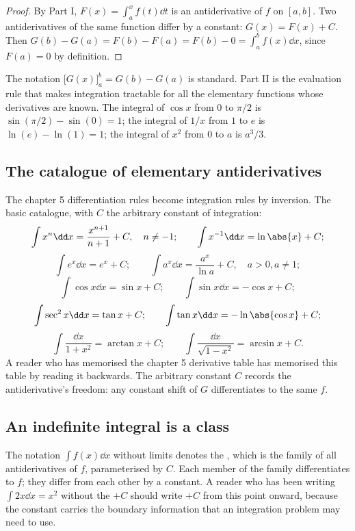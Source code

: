 \begin{proof}
By Part I, $F(x) = \int_{a}^{x} f(t) \dd t$ is an antiderivative of
$f$ on $[a,b]$. Two antiderivatives of the same function differ by
a constant: $G(x) = F(x) + C$. Then $G(b) - G(a) = F(b) - F(a) =
F(b) - 0 = \int_{a}^{b} f(x) \dd x$, since $F(a) = 0$ by
definition.
\end{proof}

The notation $\bigl[G(x)\bigr]_{a}^{b} = G(b) - G(a)$ is standard.
Part II is the evaluation rule that makes integration tractable for
all the elementary functions whose derivatives are known. The
integral of $\cos x$ from $0$ to $\pi/2$ is $\sin(\pi/2) - \sin(0) =
1$; the integral of $1/x$ from $1$ to $e$ is $\ln(e) - \ln(1) = 1$;
the integral of $x^{2}$ from $0$ to $a$ is $a^{3}/3$.

\subsection{The catalogue of elementary antiderivatives}

The chapter 5 differentiation rules become integration rules by
inversion. The basic catalogue, with $C$ the arbitrary constant of
integration:
\[
\int x^{n} \dd x = \frac{x^{n+1}}{n+1} + C, \quad n \neq -1; \qquad
\int x^{-1} \dd x = \ln \abs{x} + C;
\]
\[
\int e^{x} \dd x = e^{x} + C; \qquad
\int a^{x} \dd x = \frac{a^{x}}{\ln a} + C, \quad a > 0, a \neq 1;
\]
\[
\int \cos x \dd x = \sin x + C; \qquad
\int \sin x \dd x = -\cos x + C;
\]
\[
\int \sec^{2} x \dd x = \tan x + C; \qquad
\int \tan x \dd x = -\ln \abs{\cos x} + C;
\]
\[
\int \frac{\dd x}{1 + x^{2}} = \arctan x + C; \qquad
\int \frac{\dd x}{\sqrt{1 - x^{2}}} = \arcsin x + C.
\]
A reader who has memorised the chapter 5 derivative table has
memorised this table by reading it backwards. The arbitrary
constant $C$ records the antiderivative's freedom: any constant
shift of $G$ differentiates to the same $f$.

\subsection{An indefinite integral is a class}

The notation $\int f(x) \dd x$ without limits denotes the
, which is the family of all
antiderivatives of $f$, parameterised by $C$. Each member of the
family differentiates to $f$; they differ from each other by a
constant. A reader who has been writing $\int 2x \dd x = x^{2}$
without the $+C$ should write $+C$ from this point onward, because
the constant carries the boundary information that an integration
problem may need to use.

